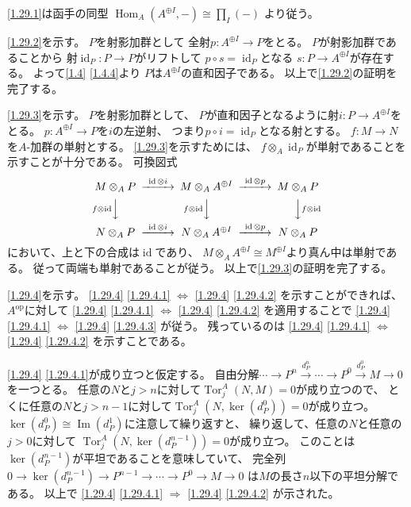 \documentclass[uplatex,dvipdfmx]{jsarticle}
\makeatletter
\theoremstyle{definition}
\renewenvironment{proof}[1][\proofname]{
  \pushQED{\qed}%
  \normalfont \topsep6\p@\@plus6\p@\relax
  \trivlist
  \item[\hskip\labelsep
    #1\@addpunct{\textbf{.}}]\ignorespaces
}{%
  \popQED\endtrivlist\@endpefalse
}
\providecommand{\proofname}{証明}
\DeclareMathOperator{\Hom}{\mathrm{Hom}}
\DeclareMathOperator{\id}{\mathrm{id}}
\DeclareMathOperator{\im}{\mathrm{Im}}
\newcommand{\op}{\mathrm{op}}
\DeclareMathOperator{\Tor}{\mathrm{Tor}}
\makeatother
\begin{document}
\begin{proof}
  \ref{1.29.1}は函手の同型
  \(\Hom_A(A^{\oplus I},-) \cong \prod_I(-)\)
  より従う。

  \ref{1.29.2}を示す。
  \(P\)を射影加群として
  全射\(p:A^{\oplus I}\to P\)をとる。
  \(P\)が射影加群であることから
  射\(\id_P:P\to P\)がリフトして
  \(p\circ s=\id_P\)となる
  \(s:P\to A^{\oplus I}\)が存在する。
  よって\autoref{1.4} \ref{1.4.4}より
  \(P\)は\(A^{\oplus I}\)の直和因子である。
  以上で\ref{1.29.2}の証明を完了する。

  \ref{1.29.3}を示す。
  \(P\)を射影加群として、
  \(P\)が直和因子となるように射\(i:P\to A^{\oplus I}\)をとる。
  \(p:A^{\oplus I}\to P\)を\(i\)の左逆射、
  つまり\(p\circ i = \id_P\)となる射とする。
  \(f:M\to N\)を\(A\)-加群の単射とする。
  \ref{1.29.3}を示すためには、
  \(f\otimes_A \id_P\)が単射であることを示すことが十分である。
  可換図式
  \[
  \begin{CD}
    M\otimes_A P @> \id \otimes i >>
    M\otimes_A A^{\oplus I} @> \id \otimes p >> M\otimes_A P \\
    @V f\otimes \id VV @V f\otimes \id VV @VV f\otimes \id V \\
    N\otimes_A P @> \id \otimes i >>
    N\otimes_A A^{\oplus I} @> \id \otimes p >> N\otimes_A P
  \end{CD}
  \]
  において、上と下の合成は\(\id\)であり、
  \(M\otimes_A A^{\oplus I}\cong M^{\oplus I}\)より真ん中は単射である。
  従って両端も単射であることが従う。
  以上で\ref{1.29.3}の証明を完了する。

  \ref{1.29.4}を示す。
  \ref{1.29.4} \ref{1.29.4.1} \(\iff\) \ref{1.29.4} \ref{1.29.4.2}
  を示すことができれば、
  \(A^{\op}\)に対して
  \ref{1.29.4} \ref{1.29.4.1} \(\iff\) \ref{1.29.4} \ref{1.29.4.2}
  を適用することで
  \ref{1.29.4} \ref{1.29.4.1} \(\iff\) \ref{1.29.4} \ref{1.29.4.3}
  が従う。
  残っているのは
  \ref{1.29.4} \ref{1.29.4.1} \(\iff\) \ref{1.29.4} \ref{1.29.4.2}
  を示すことである。

  \ref{1.29.4} \ref{1.29.4.1}が成り立つと仮定する。
  自由分解\(\cdots \to P^n \xrightarrow{d_P^n} \cdots \to P^0 \xrightarrow{d_P^0} M\to 0\)
  を一つとる。
  任意の\(N\)と\(j>n\)に対して\(\Tor_j^A(N,M) = 0\)が成り立つので、
  とくに任意の\(N\)と\(j>n-1\)に対して\(\Tor_j^A(N,\ker(d_P^0))=0\)が成り立つ。
  \(\ker(d_P^0)\cong \im(d_P^1)\)に注意して繰り返すと、
  繰り返して、任意の\(N\)と任意の\(j>0\)に対して
  \(\Tor_j^A(N,\ker(d_P^{n-1})) = 0\)が成り立つ。
  このことは\(\ker(d_P^{n-1})\)が平坦であることを意味していて、
  完全列
  \(0\to \ker(d_P^{n-1}) \to P^{n-1} \to \cdots \to P^0 \to M \to 0\)
  は\(M\)の長さ\(n\)以下の平坦分解である。
  以上で
  \ref{1.29.4} \ref{1.29.4.1} \(\Rightarrow\) \ref{1.29.4} \ref{1.29.4.2}
  が示された。


\end{proof}
\end{document}
